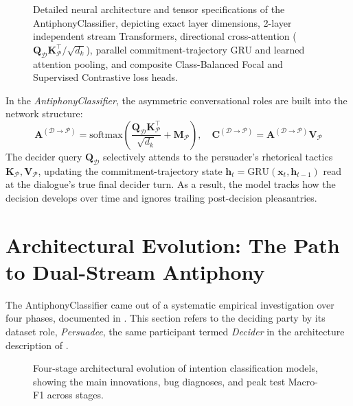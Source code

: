 \begin{figure}[p]
  \centering
  \resizebox{\textwidth}{!}{}
  \caption{Detailed neural architecture and tensor specifications of the AntiphonyClassifier, depicting exact layer dimensions, 2-layer independent stream Transformers, directional cross-attention ($\mathbf{Q}_{\mathcal{D}} \mathbf{K}_{\mathcal{P}}^\top / \sqrt{d_k}$), parallel commitment-trajectory GRU and learned attention pooling, and composite Class-Balanced Focal and Supervised Contrastive loss heads.}
  \label{fig:antiphony_arch}
\end{figure}

\begin{summarybox}
In the \textit{AntiphonyClassifier}, the asymmetric conversational roles are built into the network structure:
\begin{equation}
  \mathbf{A}^{(\mathcal{D} \to \mathcal{P})} = \text{softmax}\left(\frac{\mathbf{Q}_{\mathcal{D}} \mathbf{K}_{\mathcal{P}}^\top}{\sqrt{d_k}} + \mathbf{M}_{\mathcal{P}}\right), \quad \mathbf{C}^{(\mathcal{D} \to \mathcal{P})} = \mathbf{A}^{(\mathcal{D} \to \mathcal{P})} \mathbf{V}_{\mathcal{P}}
\end{equation}
The decider query $\mathbf{Q}_{\mathcal{D}}$ selectively attends to the persuader's rhetorical tactics $\mathbf{K}_{\mathcal{P}}, \mathbf{V}_{\mathcal{P}}$, updating the commitment-trajectory state $\mathbf{h}_t = \text{GRU}(\mathbf{x}_t, \mathbf{h}_{t-1})$ read at the dialogue's true final decider turn. As a result, the model tracks how the decision develops over time and ignores trailing post-decision pleasantries.
\end{summarybox}

\clearpage
\section{Architectural Evolution: The Path to Dual-Stream Antiphony}
\label{sec:evolution}

The AntiphonyClassifier came out of a systematic empirical investigation over four phases, documented in . This section refers to the deciding party by its dataset role, \emph{Persuadee}, the same participant termed \emph{Decider} in the architecture description of .

\begin{figure}[htbp]
  \centering
  \resizebox{\textwidth}{!}{}
  \caption{Four-stage architectural evolution of intention classification models, showing the main innovations, bug diagnoses, and peak test Macro-F1 across stages.}
  \label{fig:architectural_evolution}
\end{figure}

